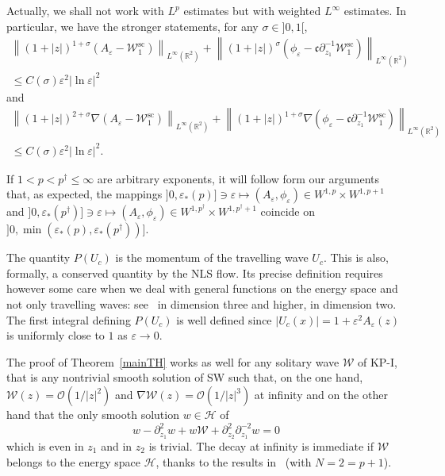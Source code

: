 \documentclass[AHL,Unicode,longabstracts,published]{cedram}
\newcommand*\p{\partial}
\newcommand*\R{\mathbb R}
\renewcommand{\sc}{\mathrm{sc}}
\newcommand*\BO{\mathcal{O}}
\newcommand*\BH{\mathcal{H}}
\newcommand*\BW{\mathcal{W}}
\newcommand*\cs{{\mathfrak c}}
\newcommand*\ii{\infty}
\newcommand*\ls{\leqslant }
\newcommand*\e{\varepsilon}
\newcommand*\lne{\lvert \ln \varepsilon \rvert}
\newcommand*\s{\sigma}
\begin{document}
\begin{rema}
Actually, we shall not work with $L^p $ estimates but with weighted $ L^\ii $ estimates. In particular, we have the stronger statements, for any $\s \in]0,1 [$,
\begin{multline*}
\left\| (1+|z|)^{1+\s} \left(A_\e - \BW_1^{\sc}\right) \right\|_{ L^\ii (\R^2)} + \left\|(1+|z|)^{\s} \left(\phi_\e - \cs \p_{z_1}^{-1} \BW_1^{\sc}\right)\right\|_{ L^\ii (\R^2)}
\\
\ls C (\s) \e^2 \lne^2
\end{multline*}
and
\begin{multline*}
\left\| (1+|z|)^{2+\s} \nabla (A_\e - \BW_1^{\sc}) \right\|_{ L^\ii (\R^2)} + \left\| (1+|z|)^{1+\s} \nabla \left(\phi_\e - \cs \p_{z_1}^{-1} \BW_1^{\sc}\right) \right\|_{ L^\ii (\R^2)}\\
\ls C (\s) \e^2 \lne^2.
\end{multline*}
\end{rema}

\begin{rema}
If $ 1 < p < p^\dag \ls \ii $ are arbitrary exponents, it will follow form our arguments that, as expected, the mappings $] 0, \e_*(p)] \ni \e \mapsto (A_\e, \phi_\e)
\in W^{1,p} \times W^{1,p+1 }$ and $] 0, \e_*(p^\dag)] \ni \e \mapsto (A_\e, \phi_\e) \in W^{1,p^\dag} \times W^{1,p^\dag+1 } $ coincide on $] 0, \min(\e_*(p), \e_*(p^\dag))] $.
\end{rema}

\begin{rema}
The quantity $ P (U_c) $ is the momentum of the travelling wave $ U_c $. This is also, formally, a conserved quantity by the NLS flow. Its precise definition requires however some care when we deal with general functions on the energy space and not only travelling waves: see~\cite{M_exist} in dimension three and higher, \cite{CM1} in dimension two. The first integral defining $ P(U_c) $ is well defined since $ |U_c (x)| = 1 + \e^2 A_\e(z) $ is uniformly close to $1$ as $ \e \to 0 $.
\end{rema}


\begin{rema}
The proof of Theorem~\ref{mainTH} works as well for any solitary wave $ \BW $ of KP-I, that is any nontrivial smooth solution of SW such that, on the one hand, $ \BW (z) = \BO(1/ |z|^2) $ and $ \nabla \BW (z) = \BO(1/ |z|^3) $ at infinity and on the other hand that the only smooth solution $ w \in \BH $ of
\[
w - \p^2_{z_1} w + w \BW + \p_{z_2}^2 \p_{z_1}^{-2} w = 0
\]
which is even in $z_1 $ and in $z_2 $ is trivial. The decay at infinity is immediate if $ \BW $ belongs to the energy space $ \BH $, thanks to the results in~\cite[Theorem~1.11]{Gravos} (with $ N= 2 = p+1 $).
\end{rema}
\end{document}
